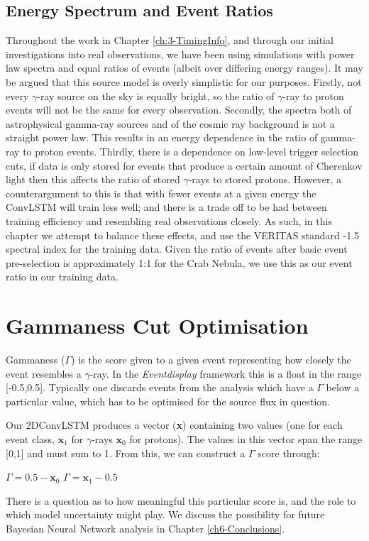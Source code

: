 \subsection{Energy Spectrum and Event Ratios}
Throughout the work in Chapter \ref{ch:3-TimingInfo}, and through our initial investigations into real observations, we have been using simulations with power law spectra and equal ratios of events (albeit over differing energy ranges). It may be argued that this source model is overly simplistic for our purposes. Firstly, not every $\gamma$-ray source on the sky is equally bright, so the ratio of $\gamma$-ray to proton events will not be the same for every observation. Secondly, the spectra both of astrophysical gamma-ray sources and of the cosmic ray background is not a straight power law. This results in an energy dependence in the ratio of gamma-ray to proton events. Thirdly, there is a dependence on low-level trigger selection cuts, if data is only stored for events that produce a certain amount of Cherenkov light then this affects the ratio of stored $\gamma$-rays to stored protons. However, a counterargument to this is that with fewer events at a given energy the ConvLSTM will train less well; and there is a trade off to be had between training efficiency and resembling real observations closely. As such, in this chapter we attempt to balance these effects, and use the VERITAS standard -1.5 spectral index for the training data. Given the ratio of events after basic event pre-selection is approximately 1:1 for the Crab Nebula, we use this as our event ratio in our training data.

\section{Gammaness Cut Optimisation}
Gammaness ($\Gamma$) is the score given to a given event representing how closely the event resembles a $\gamma$-ray. In the \textit{Eventdisplay} framework this is a float in the range [-0.5,0.5]. Typically one discards events from the analysis which have a $\Gamma$ below a particular value, which has to be optimised for the source flux in question. 

Our 2DConvLSTM produces a vector (\textbf{x}) containing two values (one for each event class,   $\textbf{x}_1$ for $\gamma$-rays $\textbf{x}_0$ for protons). The values in this vector span the range [0,1] and must sum to 1. From this, we can construct a $\Gamma$ score through:

\begin{algorithmic}
    \STATE $\Gamma=0.5-\textbf{x}_0$
    \ELSE
    \STATE $\Gamma=\textbf{x}_1-0.5$
    \ENDIF
\end{algorithmic}
There is a question as to how meaningful this particular score is, and the role to which model uncertainty might play. We discuss the possibility for future Bayesian Neural Network analysis in Chapter \ref{ch6-Conclusions}.

